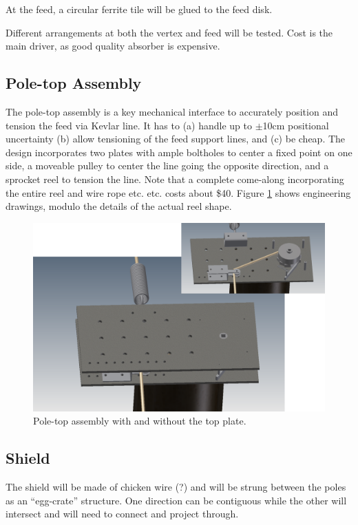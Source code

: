 \documentclass[11pt]{article}
\begin{document}
At the feed, a circular ferrite tile will be glued to the feed disk.

Different arrangements at both the vertex and feed will be tested.  Cost is the main driver, as good quality absorber is expensive.

\subsection{Pole-top Assembly}
The pole-top assembly is a key mechanical interface to accurately position and tension the feed via Kevlar line.  It has to (a) handle up to $\pm$10cm positional uncertainty (b) allow tensioning of the feed support lines, and (c) be cheap.  The design incorporates two plates with ample boltholes to center a fixed point on one side, a moveable pulley to center the line going the opposite direction, and a sprocket reel to tension the line.  Note that a complete come-along incorporating the entire reel and wire rope etc. etc. costs about \$40.  Figure \ref{fig:poletop} shows engineering drawings, modulo the details of the actual reel shape.

\begin{figure}[H]
\centering
\includegraphics[width=\textwidth]{plots/poletop.png}
\caption{Pole-top assembly with and without the top plate.}
\label{fig:poletop}
\end{figure}

\subsection{Shield}
The shield will be made of chicken wire (?) and will be strung between the poles as an “egg-crate” structure.  One direction can be contiguous while the other will intersect and will need to connect and project through.
\end{document}
